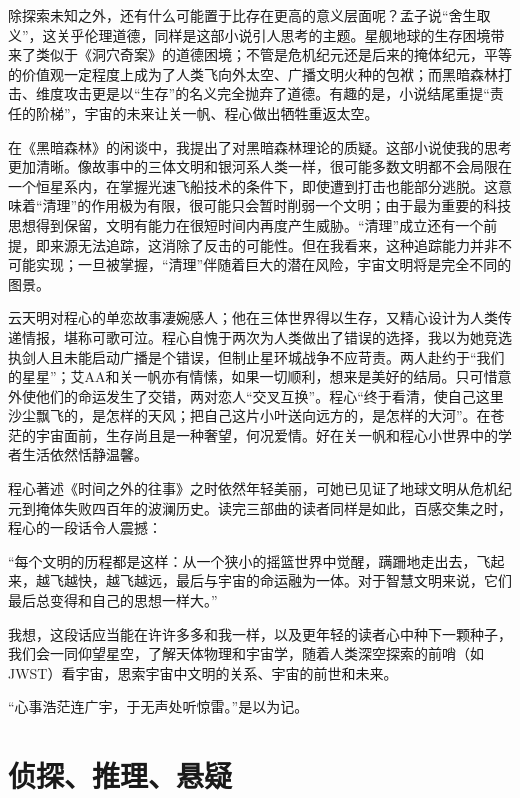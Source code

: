 \par 除探索未知之外，还有什么可能置于比存在更高的意义层面呢？孟子说“舍生取义”，这关乎伦理道德，同样是这部小说引人思考的主题。星舰地球的生存困境带来了类似于《洞穴奇案》的道德困境；不管是危机纪元还是后来的掩体纪元，平等的价值观一定程度上成为了人类飞向外太空、广播文明火种的包袱；而黑暗森林打击、维度攻击更是以“生存”的名义完全抛弃了道德。有趣的是，小说结尾重提“责任的阶梯”，宇宙的未来让关一帆、程心做出牺牲重返太空。
\par 在《黑暗森林》的闲谈中，我提出了对黑暗森林理论的质疑。这部小说使我的思考更加清晰。像故事中的三体文明和银河系人类一样，很可能多数文明都不会局限在一个恒星系内，在掌握光速飞船技术的条件下，即使遭到打击也能部分逃脱。这意味着“清理”的作用极为有限，很可能只会暂时削弱一个文明；由于最为重要的科技思想得到保留，文明有能力在很短时间内再度产生威胁。“清理”成立还有一个前提，即来源无法追踪，这消除了反击的可能性。但在我看来，这种追踪能力并非不可能实现；一旦被掌握，“清理”伴随着巨大的潜在风险，宇宙文明将是完全不同的图景。
\par 云天明对程心的单恋故事凄婉感人；他在三体世界得以生存，又精心设计为人类传递情报，堪称可歌可泣。程心自愧于两次为人类做出了错误的选择，我以为她竞选执剑人且未能启动广播是个错误，但制止星环城战争不应苛责。两人赴约于“我们的星星”；艾AA和关一帆亦有情愫，如果一切顺利，想来是美好的结局。只可惜意外使他们的命运发生了交错，两对恋人“交叉互换”。程心“终于看清，使自己这里沙尘飘飞的，是怎样的天风；把自己这片小叶送向远方的，是怎样的大河”。在苍茫的宇宙面前，生存尚且是一种奢望，何况爱情。好在关一帆和程心小世界中的学者生活依然恬静温馨。
\par 程心著述《时间之外的往事》之时依然年轻美丽，可她已见证了地球文明从危机纪元到掩体失败四百年的波澜历史。读完三部曲的读者同样是如此，百感交集之时，程心的一段话令人震撼：
\par “每个文明的历程都是这样：从一个狭小的摇篮世界中觉醒，蹒跚地走出去，飞起来，越飞越快，越飞越远，最后与宇宙的命运融为一体。对于智慧文明来说，它们最后总变得和自己的思想一样大。”
\par 我想，这段话应当能在许许多多和我一样，以及更年轻的读者心中种下一颗种子，我们会一同仰望星空，了解天体物理和宇宙学，随着人类深空探索的前哨（如JWST）看宇宙，思索宇宙中文明的关系、宇宙的前世和未来。
\par “心事浩茫连广宇，于无声处听惊雷。”是以为记。
\par {}

\section{侦探、推理、悬疑}

